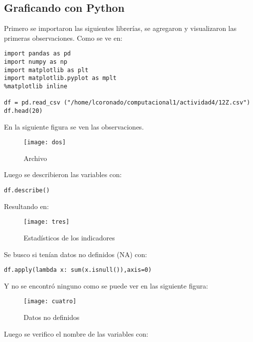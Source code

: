 \documentclass[12pt,letterpaper]{article}
\begin{document}
\subsection{Graficando con Python}

Primero se importaron las siguientes librerías, se agregaron y visualizaron las primeras observaciones. Como se ve en:
\begin{verbatim}
import pandas as pd
import numpy as np
import matplotlib as plt
import matplotlib.pyplot as mplt
%matplotlib inline

df = pd.read_csv ("/home/lcoronado/computacional1/actividad4/12Z.csv")
df.head(20)
\end{verbatim}


En la siguiente figura se ven las observaciones.

\begin{figure}[H]
\begin{center}
\texttt{[image: dos]}
\end{center}
\caption{Archivo}
\end{figure}

Luego se describieron las variables con:

\begin{verbatim}
df.describe()
\end{verbatim}

Resultando en:

\begin{figure}[H]
\begin{center}
\texttt{[image: tres]}
\end{center}
\caption{Estadísticos de los indicadores}
\end{figure}

Se busco si tenían datos no definidos (NA) con:

\begin{verbatim}
df.apply(lambda x: sum(x.isnull()),axis=0)
\end{verbatim}

Y no se encontró ninguno como se puede ver en las siguiente figura:

\begin{figure}[H]
\begin{center}
\texttt{[image: cuatro]}
\end{center}
\caption{Datos no definidos}
\end{figure}

Luego se verifico el nombre de las variables con:
\end{document}
